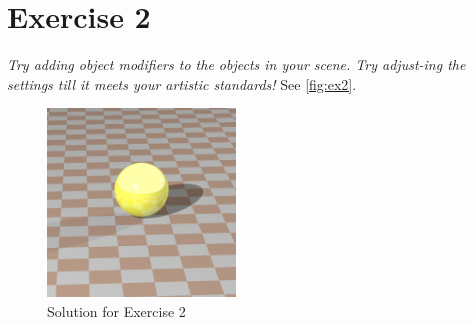 \section{Exercise 2}
\textit{Try adding object modifiers to the objects in your scene. Try adjust-ing the settings till it meets your artistic standards!}
See \autoref{fig:ex2}.

\begin{figure}[h]
  \centering
  \includegraphics[height=5cm]{ex2.png}
  \caption{Solution for Exercise 2}
  \label{fig:ex2}
\end{figure}